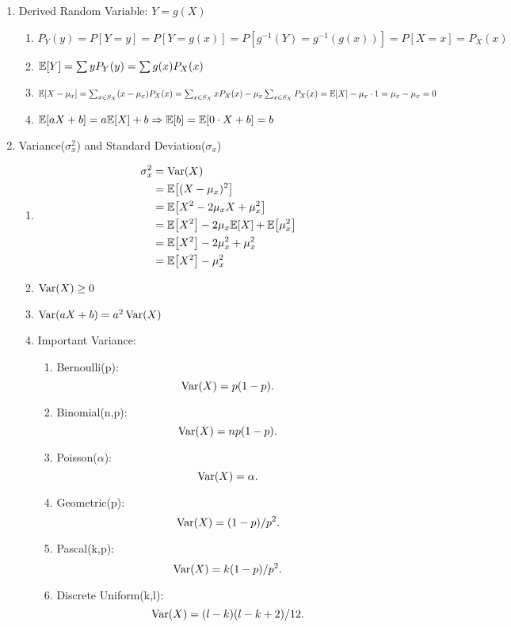 \begin{enumerate}
{    }
    \item Derived Random Variable: $Y = g(X)${
        \begin{enumerate}
            \item $P_Y(y) = P[Y=y] = P[Y=g(x)] = P[g^{-1}(Y)=g^{-1}(g(x))] = P[X=x] = P_X(x)$
            \item $\E{Y} = \sum yP_Y(y) = \sum g(x)P_X(x)$
            \item $\E{X-\mu_x}=\sum_{x\in S_X}(x-\mu_x)P_X(x)=\sum_{x\in S_X}xP_X(x)-\mu_x\sum_{x\in S_X}P_X(x)=\E{X}-\mu_x\cdot 1=\mu_x-\mu_x=0$
            \item $\E{aX+b}=a\E{X}+b \Rightarrow \E{b}=\E{0\cdot X+b}=b$
        \end{enumerate}
    }
    \item Variance($\sigma_x^2$) and Standard Deviation($\sigma_x$){
        \begin{enumerate}
            \item {
                \begin{align*}
                    \sigma_x^2 
                    &= \Var(X) \\
                    &= \E{(X-\mu_x)^2} \\
                    &= \E{X^2-2\mu_xX+\mu_x^2} \\
                    &= \E{X^2}-2\mu_x\E{X}+\E{\mu_x^2} \\
                    &= \E{X^2}-2\mu_x^2+\mu_x^2 \\
                    &= \E{X^2}-\mu_x^2
                \end{align*}
            }
            \item $\mathop{\mathrm{Var}}\nolimits(X)\geq 0$
            \item $\mathop{\mathrm{Var}}\nolimits(aX+b)=a^2\mathop{\mathrm{Var}}\nolimits(X)$
            \item Important Variance:{
                \begin{enumerate}
                    \item Bernoulli(p): \[\mathop{\mathrm{Var}}\nolimits(X)=p(1-p).\]
                    \item Binomial(n,p): \[\mathop{\mathrm{Var}}\nolimits(X)=np(1-p).\]
                    \item Poisson($\alpha$): \[\mathop{\mathrm{Var}}\nolimits(X)=\alpha.\]
                    \item Geometric(p): \[\mathop{\mathrm{Var}}\nolimits(X)=(1-p)/p^2.\]
                    \item Pascal(k,p): \[\mathop{\mathrm{Var}}\nolimits(X)=k(1-p)/p^2.\]
                    \item Discrete Uniform(k,l): \[\mathop{\mathrm{Var}}\nolimits(X)=(l-k)(l-k+2)/12.\]
                \end{enumerate}
            }
        \end{enumerate}
    }
\end{enumerate}